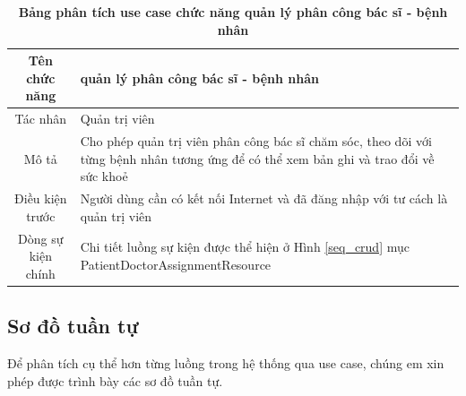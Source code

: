   \begin{table}[H]
    \caption{\bfseries \fontsize{12pt}{0pt}\selectfont Bảng phân tích use case chức năng quản lý phân công bác sĩ - bệnh nhân}
    \centering
    \begin{tabularx}{0.9\textwidth}{|c|X|}
      \hline
      \textbf{Tên chức năng} & \textbf{quản lý phân công bác sĩ - bệnh nhân} \\
      \hline
      Tác nhân & Quản trị viên \\
      \hline
      Mô tả & Cho phép quản trị viên phân công bác sĩ chăm sóc, theo dõi với từng bệnh nhân tương ứng để có thể xem bản ghi
      và trao đổi về sức khoẻ \\
      \hline
      Điều kiện trước & Người dùng cần có kết nối Internet và đã đăng nhập với tư cách là quản trị viên \\
      \hline
      Dòng sự kiện chính & 
        Chi tiết luồng sự kiện được thể hiện ở Hình \ref{seq_crud} mục PatientDoctorAssignmentResource\\
      \hline
    \end{tabularx}
  \end{table}

\newpage
\subsection{Sơ đồ tuần tự}
Để phân tích cụ thể hơn từng luồng trong hệ thống qua use case, chúng em xin phép được trình bày các sơ đồ tuần
tự. 

